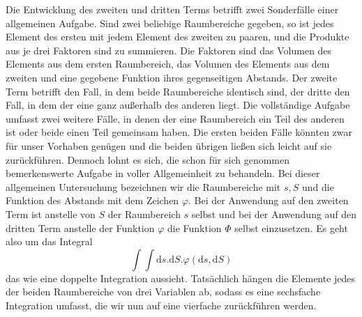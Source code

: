 Die Entwicklung des zweiten und dritten Terms betrifft zwei Sonderfälle einer allgemeinen Aufgabe. Sind zwei beliebige Raumbereiche gegeben, so ist jedes Element des ersten mit jedem Element des zweiten zu paaren, und die Produkte aus je drei Faktoren sind zu summieren. Die Faktoren sind das Volumen des Elements aus dem ersten Raumbereich, das Volumen des Elements aus dem zweiten und eine gegebene Funktion ihres gegenseitigen Abstands. Der zweite Term betrifft den Fall, in dem beide Raumbereiche identisch sind, der dritte den Fall, in dem der eine ganz außerhalb des anderen liegt. Die vollständige Aufgabe umfasst zwei weitere Fälle, in denen der eine Raumbereich ein Teil des anderen ist oder beide einen Teil gemeinsam haben. Die ersten beiden Fälle könnten zwar für unser Vorhaben genügen und die beiden übrigen ließen sich leicht auf sie zurückführen. Dennoch lohnt es sich, die schon für sich genommen bemerkenswerte Aufgabe in voller Allgemeinheit zu behandeln. Bei dieser allgemeinen Untersuchung bezeichnen wir die Raumbereiche mit $s,S$ und die Funktion des Abstands mit dem Zeichen $\varphi$. Bei der Anwendung auf den zweiten Term ist anstelle von $S$ der Raumbereich $s$ selbst und bei der Anwendung auf den dritten Term anstelle der Funktion $\varphi$ die Funktion $\Phi$ selbst einzusetzen. Es geht also um das Integral
\[
\int\int\mathrm{d}s.\mathrm{d}S.\varphi(\mathrm{d}s,\mathrm{d}S)
\]
das wie eine doppelte Integration aussieht. Tatsächlich hängen die Elemente jedes der beiden Raumbereiche von drei Variablen ab, sodass es eine sechsfache Integration umfasst, die wir nun auf eine vierfache zurückführen werden.

